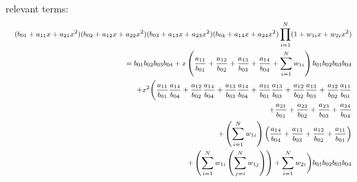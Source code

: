 \documentclass[a4paper,11pt]{article}
\newcommand{\mksmall}[1]{\textnormal{\smaller$#1$}}
\begin{document}
relevant terms:
\begin{eqnarray*}
&&
\mksmall{
(b_{01} + a_{11} x + a_{21} x^2) (b_{02} + a_{12} x + a_{22} x^2) (b_{03} + a_{13} x + a_{23} x^2) (b_{04} + a_{14} x + a_{24} x^2) \prod_{i=1}^N (1 + w_{1i} x +w_{2i} x^2)}
\\&&\quad
\mksmall{
=
b_{01} b_{02} b_{03} b_{04}
+ x \left(\frac{a_{11}}{b_{01}} + \frac{a_{12}}{b_{02}} + \frac{a_{13}}{b_{03}} + \frac{a_{14}}{b_{04}} + \sum_{i=1}^N w_{1i} \right) b_{01} b_{02} b_{03} b_{04}}
\\&&\quad
\mksmall{
+ x^2 \Bigg(
  \frac{a_{11}}{b_{01}} \frac{a_{14}}{b_{04}} + \frac{a_{12}}{b_{02}} \frac{a_{14}}{b_{04}} + \frac{a_{13}}{b_{03}} \frac{a_{14}}{b_{04}} + \frac{a_{11}}{b_{01}} \frac{a_{13}}{b_{03}} + \frac{a_{12}}{b_{02}} \frac{a_{13}}{b_{03}} + \frac{a_{12}}{b_{02}} \frac{a_{11}}{b_{01}}}
\\&&\quad
\mksmall{
+ \frac{a_{21}}{b_{01}} + \frac{a_{22}}{b_{02}} + \frac{a_{23}}{b_{03}} + \frac{a_{24}}{b_{04}}}
\\&&\quad
\mksmall{
+ \left( \sum_{i=1}^N w_{1i} \right) \left( \frac{a_{14}}{b_{04}} + \frac{a_{13}}{b_{03}} + \frac{a_{12}}{b_{02}} + \frac{a_{11}}{b_{01}} \right) }
\\&&\quad
\mksmall{
 + \left(\sum_{i=1}^N w_{1i} \left(\sum_{j=i}^N w_{1j}\right)\right) + \sum_{i=1}^N w_{2i} \Bigg) b_{01} b_{02} b_{03} b_{04}
}
\end{eqnarray*}
\end{document}
